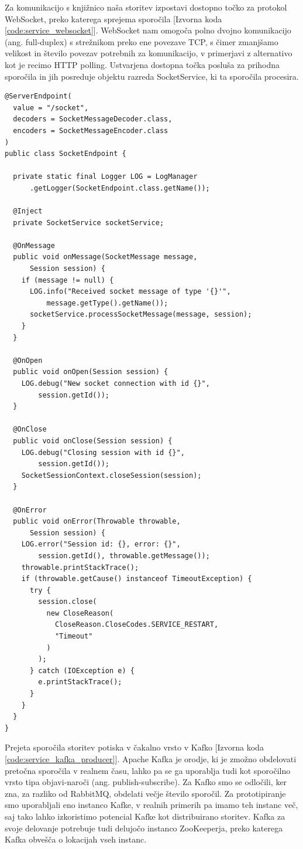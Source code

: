 \documentclass[a4paper, 12pt]{book}
\begin{document}
Za komunikacijo s knjižnico naša storitev izpostavi dostopno točko za protokol WebSocket, preko katerega sprejema sporočila [Izvorna koda \ref{code:service_websocket}]. WebSocket nam omogoča polno dvojno komunikacijo (ang. full-duplex) s strežnikom preko ene povezave TCP, s čimer zmanjšamo velikost in število povezav potrebnih za komunikacijo, v primerjavi z alternativo kot je recimo HTTP polling. Ustvarjena dostopna točka posluša za prihodna sporočila in jih posreduje objektu razreda SocketService, ki ta sporočila procesira.

\begin{lstlisting}[label=code:service_websocket, caption=WebSocket dostopna točka]
@ServerEndpoint(
  value = "/socket",
  decoders = SocketMessageDecoder.class,
  encoders = SocketMessageEncoder.class
)
public class SocketEndpoint {

  private static final Logger LOG = LogManager
      .getLogger(SocketEndpoint.class.getName());

  @Inject
  private SocketService socketService;

  @OnMessage
  public void onMessage(SocketMessage message,
      Session session) {
    if (message != null) {
      LOG.info("Received socket message of type '{}'",
          message.getType().getName());
      socketService.processSocketMessage(message, session);
    }
  }

  @OnOpen
  public void onOpen(Session session) {
    LOG.debug("New socket connection with id {}",
        session.getId());
  }

  @OnClose
  public void onClose(Session session) {
    LOG.debug("Closing session with id {}",
        session.getId());
    SocketSessionContext.closeSession(session);
  }

  @OnError
  public void onError(Throwable throwable,
      Session session) {
    LOG.error("Session id: {}, error: {}",
        session.getId(), throwable.getMessage());
    throwable.printStackTrace();
    if (throwable.getCause() instanceof TimeoutException) {
      try {
        session.close(
          new CloseReason(
            CloseReason.CloseCodes.SERVICE_RESTART,
            "Timeout"
          )
        );
      } catch (IOException e) {
        e.printStackTrace();
      }
    }
  }
}
\end{lstlisting} 

Prejeta sporočila storitev potiska v čakalno vrsto v Kafko [Izvorna koda \ref{code:service_kafka_producer}]. Apache Kafka je orodje, ki je zmožno obdelovati pretočna sporočila v realnem času, lahko pa se ga uporablja tudi kot sporočilno vrsto tipa objavi-naroči (ang. publish-subscribe). Za Kafko smo se odločili, ker zna, za razliko od RabbitMQ, obdelati večje število sporočil. Za prototipiranje smo uporabljali eno instanco Kafke, v realnih primerih pa imamo teh instanc več, saj tako lahko izkoristimo potencial Kafke kot distribuirano storitev. Kafka za svoje delovanje potrebuje tudi delujočo instanco ZooKeeperja, preko katerega Kafka obvešča o lokacijah vseh instanc.
\end{document}
